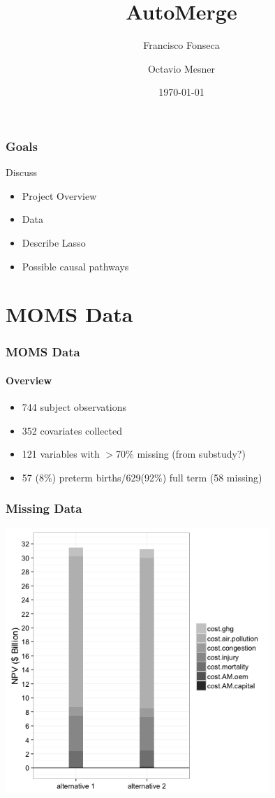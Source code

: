 \documentclass{beamer}
\title{AutoMerge}
\subtitle{}
\date{\today}
\author{Francisco Fonseca \and Octavio Mesner}
\institute{Carnegie Mellon University}
\begin{document}
\maketitle

\section{}
\begin{frame}
\frametitle{Goals}
Discuss
\begin{itemize}
\item Project Overview
\item Data
\item Describe Lasso
\item Possible causal pathways
\end{itemize}
\end{frame}

\section{MOMS Data}

\begin{frame}
  \frametitle{MOMS Data}
  \framesubtitle{Overview}
  \begin{itemize}
  \item 744 subject observations
  \item 352 covariates collected
  \item 121 variables with $>$70\% missing (from substudy?)
  \item 57 (8\%) preterm births/629(92\%) full term (58 missing)
  \end{itemize}
\end{frame}

\begin{frame}
  \frametitle{Missing Data}
  \centering
  \includegraphics[width=0.75\textwidth]{../../R/barplot1}
\end{frame}
\end{document}
